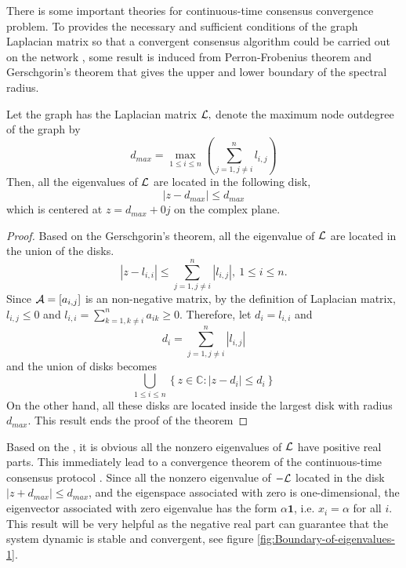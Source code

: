 There is some important theories for continuous-time consensus convergence
problem. To provides the necessary and sufficient conditions of the
graph Laplacian matrix so that a convergent consensus algorithm could
be carried out on the network , some result is induced from Perron-Frobenius
theorem and Gerschgorin's theorem that gives the upper and lower boundary
of the spectral radius. 


\begin{thm}
\cite{Olfati-Saber2004} \label{thm:Bounds of eig(L)-1}Let the graph
has the Laplacian matrix ${\cal L},$ denote the maximum node outdegree
of the graph by 
\begin{equation}
d_{max}=\max_{1\leq i\leq n}\left(\sum_{j=1,j\neq i}^{n}l_{i,j}\right)
\end{equation}
Then, all the eigenvalues of ${\cal L}$ are located in the following
disk,
\begin{equation}
\left|z-d_{max}\right|\leq d_{max}
\end{equation}
which is centered at $z=d_{max}+0j$ on the complex plane.\end{thm}
\begin{proof}
Based on the Gerschgorin's theorem, all the eigenvalue of ${\cal L}$
are located in the union of the disks.
\begin{equation}
\left|z-l_{i,i}\right|\leq\sum_{j=1,j\neq i}^{n}\left|l_{i,j}\right|,\ 1\leq i\leq n.\label{eq:disk Union of eig(L)-1}
\end{equation}
Since ${\cal A}=\left[a_{i,j}\right]$ is an non-negative matrix,
by the definition of Laplacian matrix, $l_{i,j}\leq0$ and $l_{i,i}=\sum_{k=1,k\neq i}^{n}a_{ik}\geq0.$
Therefore, let $d_{i}=l_{i,i}$ and 
\begin{equation}
d_{i}=\sum_{j=1,j\neq i}^{n}\left|l_{i,j}\right|
\end{equation}
 and the union of disks becomes
\begin{equation}
\bigcup_{1\leq i\leq n}\left\{ z\in\mathbb{C}:\left|z-d_{i}\right|\leq d_{i}\right\} 
\end{equation}
On the other hand, all these disks are located inside the largest
disk with radius $d_{max}$. This result ends the proof of the theorem
\end{proof}
Based on the , it is obvious all
the nonzero eigenvalues of ${\cal L}$ have positive real parts. This
immediately lead to a convergence theorem of the continuous-time consensus
protocol . Since all the nonzero
eigenvalue of $-{\cal L}$ located in the disk $\left|z+d_{max}\right|\leq d_{max}$,
and the eigenspace associated with zero is one-dimensional, the eigenvector
associated with zero eigenvalue has the form $\alpha\mathbf{1}$,
i.e. $x_{i}=\alpha$ for all $i$. This result will be very helpful
as the negative real part can guarantee that the system dynamic is
stable and convergent, see figure \ref{fig:Boundary-of-eigenvalues-1}.

